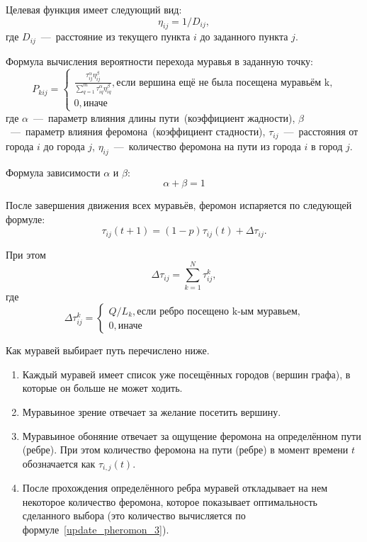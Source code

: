 Целевая функция имеет следующий вид:
\begin{equation}
	\label{d_func}
	\eta_{ij} = 1 / D_{ij},
\end{equation}
где $D_{ij}$~---~расстояние из текущего пункта $i$ до заданного пункта $j$.

Формула вычисления вероятности перехода муравья в заданную точку:
\begin{equation}
	\label{possibility_func}
	P_{kij} = \begin{cases}
		\frac{\tau_{ij}^\alpha\eta_{ij}^\beta}{\sum_{q=1}^m \tau^\alpha_{iq}\eta^\beta_{iq}}, \textrm{если вершина ещё не была посещена муравьём k,} \\
		0, \textrm{иначе}
	\end{cases}
\end{equation}
где $\alpha$~---~параметр влияния длины пути~(коэффициент жадности), $\beta$~---~параметр влияния феромона~(коэффициент стадности), $\tau_{ij}$~---~расстояния от города $i$ до города $j$, $\eta_{ij}$~---~количество феромона на пути из города $i$ в город $j$.

Формула зависимости $\alpha$ и $\beta$:
\begin{equation}
	\label{dependency_func}
	\alpha + \beta = 1
\end{equation}

После завершения движения всех муравьёв, феромон испаряется по следующей формуле:
\begin{equation}
\label{update_pheromon_1}
\tau_{ij}(t+1) = (1-p)\tau_{ij}(t) + \Delta \tau_{ij}.
\end{equation}

При этом
\begin{equation}
\label{update_pheromon_2}
\Delta \tau_{ij} = \sum_{k=1}^N \tau^k_{ij},
\end{equation}
где
\begin{equation}
\label{update_pheromon_3}
\Delta\tau^k_{ij} = \begin{cases}
	Q/L_{k}, \textrm{если ребро посещено k-ым муравьем,} \\
	0, \textrm{иначе}
\end{cases}
\end{equation}

Как муравей выбирает путь перечислено ниже.
\begin{enumerate}
\item Каждый муравей имеет список уже посещённых городов (вершин графа), в которые он больше не может ходить.
\item Муравьиное зрение отвечает за желание посетить вершину.
\item Муравьиное обоняние отвечает за ощущение феромона на определённом пути (ребре). При этом количество феромона на пути (ребре) в момент времени $t$ обозначается как $\tau_{i, j} (t)$.
\item После прохождения определённого ребра муравей откладывает на нем некоторое количество феромона, которое показывает оптимальность сделанного выбора (это количество вычисляется по формуле~\eqref{update_pheromon_3}).
\end{enumerate}

